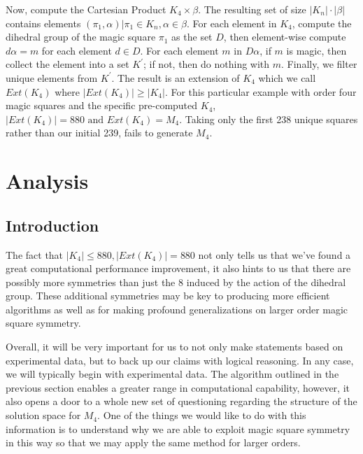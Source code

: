 \documentclass[12pt]{report}
\begin{document}
\par Now, compute the Cartesian Product $K_4 \times \beta$. The resulting set of size $\left|K_n
  \right|\cdot \left|\beta \right|$ contains elements $\left(\pi_1, \alpha\right)\vert \pi_1\in
  K_n, \alpha\in \beta$.
For each element in $K_4$, compute the dihedral group of the magic square $\pi_1$ as the set $D$, then
element-wise compute $d\alpha=m$ for each element $d\in D$. For each element $m$ in $D\alpha$, if
$m$ is
magic, then collect the element into a set $K^\prime$; if not, then do nothing with $m$. Finally,
we filter unique elements from $K^\prime$. The result is an extension of $K_4$ which we call
$Ext\left(K_4\right)$ where $\left|Ext\left(K_4\right) \right|\geq \left|K_4 \right|$. For this
particular example with order four magic squares and the specific pre-computed $K_4$,
$\left|Ext\left(K_4\right) \right|=880 \text{ and } Ext\left(K_4\right)=M_4$. Taking only the first
238 unique squares rather than our initial 239, fails to generate $M_4$.

\chapter{Analysis}

\section{Introduction} The fact that $\left|K_4\right|\leq 880, \left|Ext\left(K_4
  \right)\right|=880$ not only tells us that we've found a great computational performance
improvement, it also hints to us that there are possibly more symmetries than just the 8 induced by
the action of the dihedral group. These additional symmetries may be key to producing more
efficient algorithms as well as for making profound generalizations on larger order magic square
symmetry.

\par Overall, it will be very important for us to not only make statements based on experimental
data, but to back up our claims with logical reasoning. In any case, we will typically begin with
experimental data. The algorithm outlined in the previous section enables a greater range in
computational capability, however, it also opens a door to a whole new set of questioning regarding
the structure of the solution space for $M_4$. One of the things we would like to do with this
information is to understand why we are able to exploit magic square symmetry in this way so that
we may apply the same method for larger orders.
\end{document}
